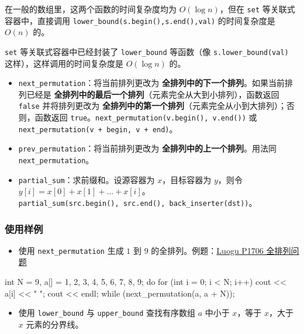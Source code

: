 在一般的数组里，这两个函数的时间复杂度均为 \(O(\log n)\)，但在 \texttt{set} 等关联式容器中，直接调用 \texttt{lower\_bound(s.begin(),s.end(),val)} 的时间复杂度是 \(O(n)\) 的。

\texttt{set} 等关联式容器中已经封装了 \texttt{lower\_bound} 等函数（像 \texttt{s.lower\_bound(val)} 这样），这样调用的时间复杂度是 \(O(\log n)\) 的。

\begin{itemize}
\item
  \texttt{next\_permutation}：将当前排列更改为 \textbf{全排列中的下一个排列}。如果当前排列已经是 \textbf{全排列中的最后一个排列}（元素完全从大到小排列），函数返回 \texttt{false} 并将排列更改为 \textbf{全排列中的第一个排列}（元素完全从小到大排列）；否则，函数返回 \texttt{true}。\texttt{next\_permutation(v.begin(),\ v.end())} 或 \texttt{next\_permutation(v\ +\ begin,\ v\ +\ end)}。
\item
  \texttt{prev\_permutation}：将当前排列更改为 \textbf{全排列中的上一个排列}。用法同 \texttt{next\_permutation}。
\item
  \texttt{partial\_sum}：求前缀和。设源容器为 \(x\)，目标容器为 \(y\)，则令 \(y[i]=x[0]+x[1]+\dots+x[i]\)。\texttt{partial\_sum(src.begin(),\ src.end(),\ back\_inserter(dst))}。
\end{itemize}

\subsubsection{使用样例}\label{ux4f7fux7528ux6837ux4f8b-2}

\begin{itemize}
\tightlist
\item
  使用 \texttt{next\_permutation} 生成 \(1\) 到 \(9\) 的全排列。例题：\href{https://www.luogu.com.cn/problem/P1706}{Luogu P1706 全排列问题}
\end{itemize}


\begin{codeline}
int N = 9, a[] = {1, 2, 3, 4, 5, 6, 7, 8, 9};
do {
    for (int i = 0; i < N; i++) cout << a[i] << " ";
    cout << endl;
} while (next_permutation(a, a + N));
\end{codeline}


\begin{itemize}
\tightlist
\item
  使用 \texttt{lower\_bound} 与 \texttt{upper\_bound} 查找有序数组 \(a\) 中小于 \(x\)，等于 \(x\)，大于 \(x\) 元素的分界线。
\end{itemize}


